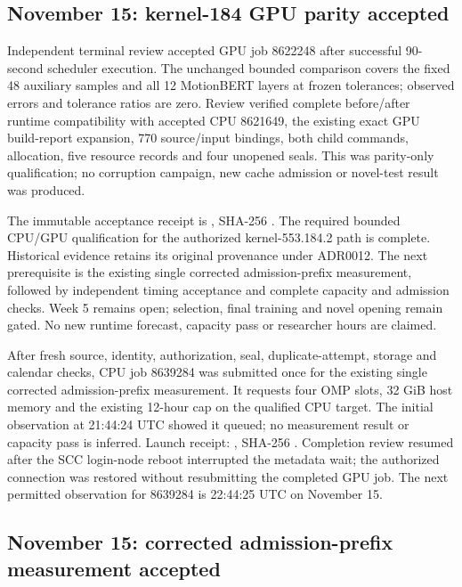 \subsection*{November 15: kernel-184 GPU parity accepted}

Independent terminal review accepted GPU job 8622248 after successful
90-second scheduler execution. The unchanged bounded comparison covers the
fixed 48 auxiliary samples and all 12 MotionBERT layers at frozen tolerances;
observed errors and tolerance ratios are zero. Review verified complete
before/after runtime compatibility with accepted CPU 8621649, the existing
exact GPU build-report expansion, 770 source/input bindings, both child
commands, allocation, five resource records and four unopened seals. This was
parity-only qualification; no corruption campaign, new cache admission or
novel-test result was produced.

The immutable acceptance receipt is
,
SHA-256
.
The required bounded CPU/GPU qualification for the authorized kernel-553.184.2
path is complete. Historical evidence retains its original provenance under
ADR0012. The next prerequisite is the existing single corrected admission-prefix
measurement, followed by independent timing acceptance and complete capacity
and admission checks. Week 5 remains open; selection, final training and novel
opening remain gated. No new runtime forecast, capacity pass or researcher
hours are claimed.

After fresh source, identity, authorization, seal, duplicate-attempt, storage
and calendar checks, CPU job 8639284 was submitted once for the existing single
corrected admission-prefix measurement. It requests four OMP slots, 32 GiB
host memory and the existing 12-hour cap on the qualified CPU target. The
initial observation at 21:44:24 UTC showed it queued; no measurement result
or capacity pass is inferred. Launch receipt:
,
SHA-256
.
Completion review resumed after the SCC login-node reboot interrupted the
metadata wait; the authorized connection was restored without resubmitting
the completed GPU job. The next permitted observation for 8639284 is
22:44:25 UTC on November 15.

\subsection*{November 15: corrected admission-prefix measurement accepted}

